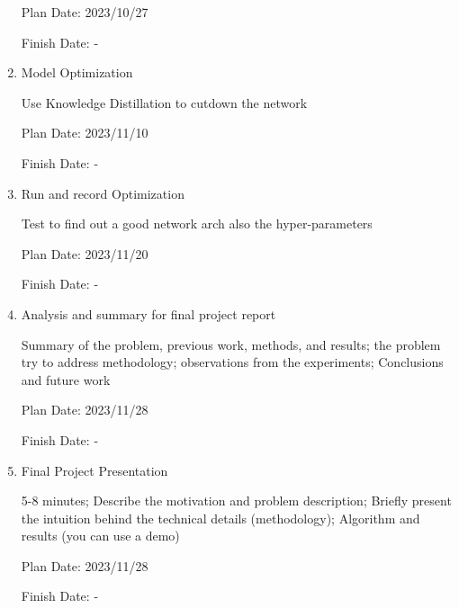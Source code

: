 \begin{enumerate}
  Plan Date: 2023/10/27 
    
  Finish Date: - 
  
  \item Model Optimization
  
  Use Knowledge Distillation to cutdown the network
  
  Plan Date: 2023/11/10 
    
  Finish Date: -
  
  \item Run and record Optimization
  
  Test to find out a good network arch also the hyper-parameters
  
  Plan Date: 2023/11/20 
    
  Finish Date: - 
  
  \item Analysis and summary for final project report
  
  Summary of the problem, previous work, methods, and results; the problem try to address methodology; observations from the experiments; Conclusions and future work
  
  Plan Date: 2023/11/28 
    
  Finish Date: -

  \item Final Project Presentation
  
  5-8 minutes; Describe the motivation and problem description; Briefly present the intuition behind the technical details (methodology); Algorithm and results (you can use a demo)
  
  Plan Date: 2023/11/28 
    
  Finish Date: -
  
\end{enumerate}

